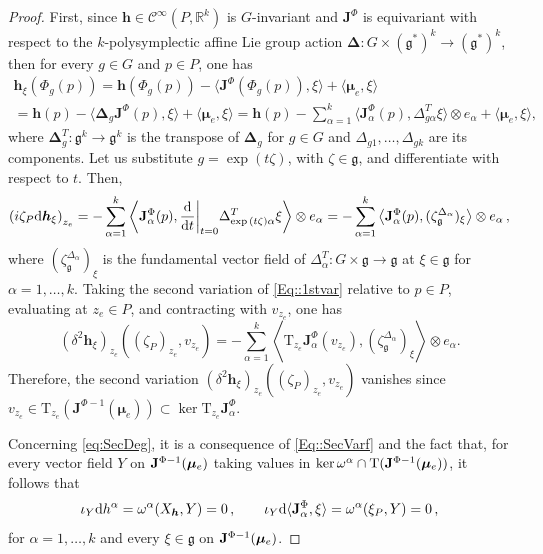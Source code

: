 \documentclass[10pt,a4paper]{amsart}
\newcommand\restr[2]{{%
  \left.\kern-\nulldelimiterspace %
  #1 %
  \right|_{#2} %
}}
\newcommand{\Cinfty}{\mathscr{C}^\infty}
\newcommand{\R}{\mathbb{R}}
\newcommand{\T}{\mathrm{T}}
\newcommand{\bh}{{\boldsymbol{h}}}
\newcommand{\inn}{i}
\renewcommand{\d}{\mathrm{d}}
\begin{document}
\begin{proof}
First, since $\bh\in \Cinfty(P,\R^k)$ is $G$-invariant and $\mathbf{J}^\Phi$ is equivariant with respect to the $k$-polysymplectic affine Lie group action $\boldsymbol{\Delta}:G \times (\mathfrak{g}^*)^k\rightarrow (\mathfrak{g}^*)^k$, then for every $g\in G$ and $p\in P$, one has
\begin{multline*}
\boldsymbol{h}_\xi(\Phi_g(p)) = \boldsymbol{h}(\Phi_g(p))-\langle \mathbf{J}^\Phi(\Phi_g(p)),\xi\rangle +\langle {\bm \mu}_e,\xi\rangle \\
= \boldsymbol{h}(p)-\langle \boldsymbol{\Delta}_g\mathbf{J}^\Phi(p),\xi\rangle +\langle \bm\mu_e,\xi\rangle %
=\boldsymbol{h}(p)-\sum_{\alpha=1}^k\langle \mathbf{J}_\alpha^\Phi(p),\Delta_{g\alpha}^T\xi\rangle \otimes e_\alpha+\langle \bm\mu_e,\xi\rangle,
\end{multline*}
where $\boldsymbol{\Delta}^T_g:\mathfrak{g}^k\rightarrow \mathfrak{g}^k$ is the transpose of $\boldsymbol{\Delta}_g$ for $g\in G$ and $\Delta_{g1},\ldots,\Delta_{gk}$  are its components. Let us substitute $g=\exp(t\zeta)$, with $\zeta\in\mathfrak{g}$, and differentiate with respect to $t$. Then,
\begin{equation}
\label{Eq::1stvar}
\left(\inn{\zeta_P}\d\boldsymbol{h}_\xi\right)_{z_e}=-\sum_{\alpha=1}^k\left\langle \mathbf{J}_\alpha^\Phi(p),\restr{\frac{\d}{\d t}}{t=0}{\Delta}^T_{\exp{(t\zeta)\alpha}}\xi \right\rangle\otimes e_\alpha=-\sum_{\alpha=1}^k\left\langle \mathbf{J}_\alpha^\Phi(p),(\zeta^{{\Delta}_\alpha}_{\mathfrak{g}})_{\xi}\right\rangle \otimes e_\alpha\,,
\end{equation}
where $(\zeta^{{\Delta}_\alpha}_{\mathfrak{g}})_{\xi}$ is the fundamental vector field of ${\Delta}_\alpha^T:G\times\mathfrak{g}\rightarrow \mathfrak{g}$ at $\xi\in\mathfrak{g}$ for $\alpha=1,\ldots,k$. Taking the second variation of \eqref{Eq::1stvar} relative to $p\in P$, evaluating at $z_e\in P$, and contracting with $v_{z_e}$, one has
\[
\left(\delta^2 \boldsymbol{h}_\xi \right)_{z_e}((\zeta_P)_{z_e},v_{z_e})=-\sum_{\alpha=1}^k\left\langle \T_{z_e}\mathbf{J}_\alpha^\Phi\left(v_{z_e}\right), (\zeta^{{\Delta}_\alpha}_{\mathfrak{g}})_{\xi}\right\rangle\otimes e_\alpha .
\]
Therefore, the second variation $\left(\delta^2 \boldsymbol{h}_\xi \right)_{z_e}((\zeta_P)_{z_e},v_{z_e})$ vanishes since $v_{z_e}\in \T_{z_e}(\mathbf{J}^{\Phi-1}(\boldsymbol{\mu}_e))\subset \ker \T_{z_e}\mathbf{J}^{\Phi}_\alpha$.

Concerning \eqref{eq:SecDeg}, it is a consequence of \eqref{Eq::SecVarf} and the fact that, for every vector field $Y$ on ${\bf J}^{\Phi-1}(\bm\mu_e)$ taking values in $\ker\omega^\alpha\cap \T({\bf J}^{\Phi-1}(\bm\mu_e))$, it follows that
$$
\iota_Y\d h^\alpha=\omega^\alpha(X_{\bm h},Y)=0\,,\qquad \iota_Y\d \langle {\bf J}_\alpha^\Phi,\xi\rangle =\omega^\alpha(\xi_P,Y)=0\,,
$$
for $\alpha=1,\ldots,k$ and every $\xi\in \mathfrak{g}$ on ${\bf J}^{\Phi-1}(\bm\mu_e)$. 
\end{proof}
\end{document}
